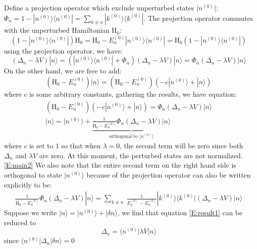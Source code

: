 \documentclass{article}
\newcommand{\huptb}{\text{H}_0}
\newcommand{\order}[2]{#1^{(#2)}}
\newcommand{\statebra}[1]{\langle #1 |}
\newcommand{\stateket}[1]{| #1 \rangle}
\begin{document}
Define a projection operator which exclude unperturbed states $|\order{n}{0}\langle$:
$\Phi_n = 1 - \stateket{\order{n}{0}}\statebra{\order{n}{0}} = \sum_{k\neq n} \stateket{\order{k}{0}}\statebra{\order{k}{0}}$. 
The projection operator commutes with the unperturbed Hamiltonian $\huptb$:
\begin{equation}
    ( 1 - \stateket{\order{n}{0}}\statebra{\order{n}{0}} ) \huptb
    = \huptb - \order{E_n}{0} \stateket{\order{n}{0}}\statebra{\order{n}{0}} 
    = \huptb ( 1 - \stateket{\order{n}{0}}\statebra{\order{n}{0}} )
\end{equation}
using the projection operator, we have:
\begin{equation}
    (\Delta_n - \lambda V) \stateket{n}
    = (\stateket{\order{n}{0}}\statebra{\order{n}{0}} + \Phi_n) (\Delta_n - \lambda V) \stateket{n} 
    = \Phi_n (\Delta_n - \lambda V) \stateket{n}
\end{equation}
On the other hand, we are free to add:
\begin{equation}
    (\huptb - \order{E_n}{0}) \stateket{n} = 
    (\huptb - \order{E_n}{0}) (-c\stateket{\order{n}{0}} + \stateket{n} )
\end{equation}
where $c$ is some arbitrary constants, gathering the results, we have equation:
\begin{gather}
    (\huptb - \order{E_n}{0}) (-c\stateket{\order{n}{0}} + \stateket{n} ) 
    = \Phi_n (\Delta_n - \lambda V) \stateket{n} \\
    \label{E:main2}
    \stateket{n} = \stateket{\order{n}{0}} 
    + \underbrace{\frac{1}{\huptb - \order{E_n}{0}} \Phi_n (\Delta_n - \lambda V) \stateket{n}}_{\text{orthogonal to } \stateket{\order{n}{0}}}
\end{gather}
where $c$ is set to $1$ so that 
when $\lambda = 0$, the second term will be zero since both $\Delta_n$ and $\lambda V$ are zero. 
At this moment, the perturbed states are not normalized. \eqref{E:main2}
We also note that the entire second term on the right hand side is orthogonal to state $\stateket{\order{n}{0}}$
because of the projection operator can also be written explicitly to be:
\begin{align}
    \frac{1}{\huptb - \order{E_n}{0}} \Phi_n (\Delta_n - \lambda V) \stateket{n}
    = \sum_{k\neq n} \ \frac{1}{\order{E_k}{0} - \order{E_n}{0}} \stateket{\order{k}{0}} \statebra{\order{k}{0}} (\Delta_n - \lambda V) \stateket{n}
\end{align}
Suppose we write $\stateket{n} = \stateket{\order{n}{0}} + \stateket{\delta  n}$, we find that equation
\eqref{E:result1} can be reduced to 
\begin{equation}
    \label{E:main1}
    \Delta_n = \statebra{\order{n}{0}} \lambda V \stateket{n}
\end{equation}
since $\statebra{\order{n}{0}} \Delta_n \stateket{\delta n} = 0$
\end{document}
